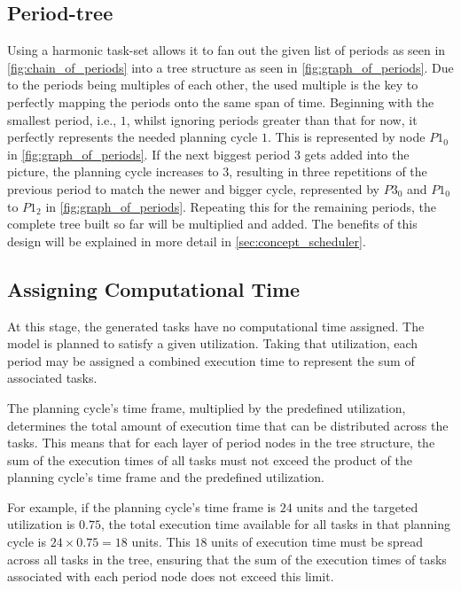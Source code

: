 \subsection{Period-tree}\label{sec:period_tree}
Using a harmonic task-set allows it to fan out the given list of periods as seen in \cref{fig:chain_of_periods} into a tree structure as seen in \cref{fig:graph_of_periods}.
Due to the periods being multiples of each other, the used multiple is the key to perfectly mapping the periods onto the same span of time.
Beginning with the smallest period, i.e., $1$, whilst ignoring periods greater than that for now, it perfectly represents the needed planning cycle $1$.
This is represented by node $P1_0$ in \cref{fig:graph_of_periods}.
If the next biggest period $3$ gets added into the picture, the planning cycle increases to $3$, resulting in three repetitions of the previous period to match the newer and bigger cycle, represented by $P3_0$ and $P1_0$ to $P1_2$ in \cref{fig:graph_of_periods}.
Repeating this for the remaining periods, the complete tree built so far will be multiplied and added.
The benefits of this design will be explained in more detail in \cref{sec:concept_scheduler}.

\subsection{Assigning Computational Time}\label{sec:concept_load_spread}
At this stage, the generated tasks have no computational time assigned.
The model is planned to satisfy a given utilization.
Taking that utilization, each period may be assigned a combined execution time to represent the sum of associated tasks.

The planning cycle's time frame, multiplied by the predefined utilization, determines the total amount of execution time that can be distributed across the tasks.
This means that for each layer of period nodes in the tree structure, the sum of the execution times of all tasks must not exceed the product of the planning cycle's time frame and the predefined utilization.

For example, if the planning cycle's time frame is $24$ units and the targeted utilization is $0.75$, the total execution time available for all tasks in that planning cycle is \(24 \times 0.75 = 18\) units.
This $18$ units of execution time must be spread across all tasks in the tree, ensuring that the sum of the execution times of tasks associated with each period node does not exceed this limit.

